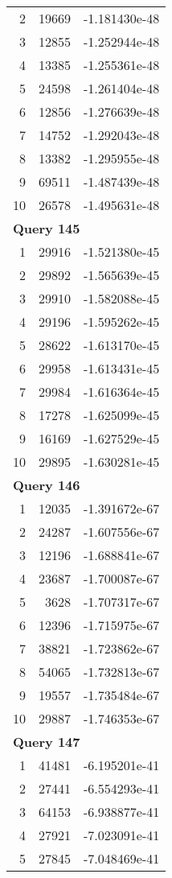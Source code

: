 \begin{longtable}[{p}]{@{}rrp{}@{}}
2 & 19669 & -1.181430e-48 \\
3 & 12855 & -1.252944e-48 \\
4 & 13385 & -1.255361e-48 \\
5 & 24598 & -1.261404e-48 \\
6 & 12856 & -1.276639e-48 \\
7 & 14752 & -1.292043e-48 \\
8 & 13382 & -1.295955e-48 \\
9 & 69511 & -1.487439e-48 \\
10 & 26578 & -1.495631e-48 \\
\midrule
\multicolumn{3}{l}{\bfseries Query 145} \\
1 & 29916 & -1.521380e-45 \\
2 & 29892 & -1.565639e-45 \\
3 & 29910 & -1.582088e-45 \\
4 & 29196 & -1.595262e-45 \\
5 & 28622 & -1.613170e-45 \\
6 & 29958 & -1.613431e-45 \\
7 & 29984 & -1.616364e-45 \\
8 & 17278 & -1.625099e-45 \\
9 & 16169 & -1.627529e-45 \\
10 & 29895 & -1.630281e-45 \\
\midrule
\multicolumn{3}{l}{\bfseries Query 146} \\
1 & 12035 & -1.391672e-67 \\
2 & 24287 & -1.607556e-67 \\
3 & 12196 & -1.688841e-67 \\
4 & 23687 & -1.700087e-67 \\
5 & 3628 & -1.707317e-67 \\
6 & 12396 & -1.715975e-67 \\
7 & 38821 & -1.723862e-67 \\
8 & 54065 & -1.732813e-67 \\
9 & 19557 & -1.735484e-67 \\
10 & 29887 & -1.746353e-67 \\
\midrule
\multicolumn{3}{l}{\bfseries Query 147} \\
1 & 41481 & -6.195201e-41 \\
2 & 27441 & -6.554293e-41 \\
3 & 64153 & -6.938877e-41 \\
4 & 27921 & -7.023091e-41 \\
5 & 27845 & -7.048469e-41 \\

\end{longtable}
